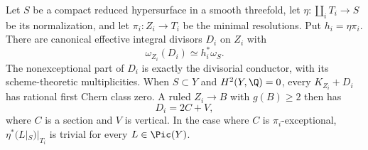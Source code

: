 
\begin{proposition}\label{cdp:st:A.5.3}
Let $S$ be a compact reduced hypersurface in a smooth threefold, let $\eta:\coprod_i T_i\to S$ be its normalization, and let $\pi_i:Z_i\to T_i$ be the minimal resolutions. Put $h_i=\eta\pi_i$. There are canonical effective integral divisors $D_i$ on $Z_i$ with
\[
 \omega_{Z_i}(D_i)\simeq h_i^*\omega_S.
 \tag{A.25}\label{cdp:eq:A.25}
\]
The nonexceptional part of $D_i$ is exactly the divisorial conductor, with its scheme-theoretic multiplicities. When $S\subset Y$ and $H^2(Y,\Q)=0$, every $K_{Z_i}+D_i$ has rational first Chern class zero. A ruled $Z_i\to B$ with $g(B)\ge2$ then has
\[
 D_i=2C+V,
 \tag{A.26}\label{cdp:eq:A.26}
\]
where $C$ is a section and $V$ is vertical. In the case where $C$ is $\pi_i$-exceptional, $\eta^*(L|_S)|_{T_i}$ is trivial for every $L\in\Pic(Y)$.
\end{proposition}
